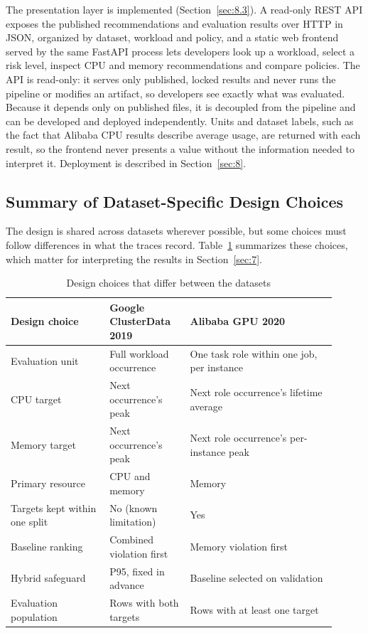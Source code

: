 The presentation layer is implemented (Section~\ref{sec:8.3}). A read-only REST API exposes the published recommendations and evaluation results over HTTP in JSON, organized by dataset, workload and policy, and a static web frontend served by the same FastAPI process lets developers look up a workload, select a risk level, inspect CPU and memory recommendations and compare policies. The API is read-only: it serves only published, locked results and never runs the pipeline or modifies an artifact, so developers see exactly what was evaluated. Because it depends only on published files, it is decoupled from the pipeline and can be developed and deployed independently. Units and dataset labels, such as the fact that Alibaba CPU results describe average usage, are returned with each result, so the frontend never presents a value without the information needed to interpret it. Deployment is described in Section~\ref{sec:8}.

\subsection{Summary of Dataset-Specific Design Choices}\label{sec:4.5}

The design is shared across datasets wherever possible, but some choices must follow differences in what the traces record. Table~\ref{tab:4.1} summarizes these choices, which matter for interpreting the results in Section~\ref{sec:7}.

\begin{table}[!t]
\centering
\footnotesize
\caption{Design choices that differ between the datasets}\label{tab:4.1}
\begin{tabular}{>{\raggedright\arraybackslash}p{0.276\linewidth}>{\raggedright\arraybackslash}p{0.225\linewidth}>{\raggedright\arraybackslash}p{0.409\linewidth}}
\hline
\textbf{Design choice} & \textbf{Google ClusterData 2019} & \textbf{Alibaba GPU 2020} \\ \hline
Evaluation unit & Full workload occurrence & One task role within one job, per instance \\
CPU target & Next occurrence's peak & Next role occurrence's lifetime average \\
Memory target & Next occurrence's peak & Next role occurrence's per-instance peak \\
Primary resource & CPU and memory & Memory \\
Targets kept within one split & No (known limitation) & Yes \\
Baseline ranking & Combined violation first & Memory violation first \\
Hybrid safeguard & P95, fixed in advance & Baseline selected on validation \\
Evaluation population & Rows with both targets & Rows with at least one target \\
\hline
\end{tabular}
\end{table}
